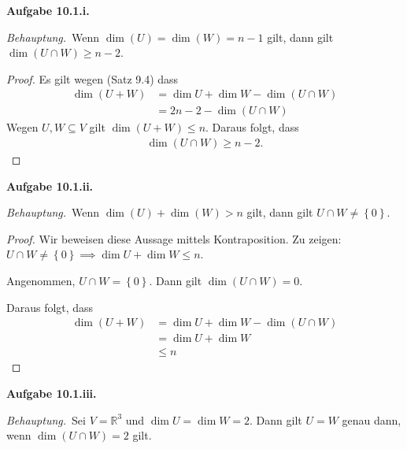 \documentclass[12pt]{extarticle}
\newcommand{\mg}[1]{\mathbb{#1}}
\newcommand{\aufgn}[1]{\textbf{Aufgabe #1.}}
\newcommand{\beh}{\textit{Behauptung.}\ }
\begin{document}
\aufgn{10.1.i}

\beh Wenn \(\dim(U) = \dim(W) = n - 1\) gilt, dann gilt
\(\dim(U \cap W) \ge n - 2\).

\begin{proof}
Es gilt wegen (Satz 9.4) dass
\begin{align*}
  \dim(U + W)
  &= \dim U + \dim W - \dim (U \cap W) \\
  &= 2n - 2 - \dim (U \cap W)
\end{align*}
Wegen \(U, W \subseteq V\) gilt \(\dim(U + W) \le n\).
Daraus folgt, dass
\begin{align*}
\dim(U \cap W) \ge n - 2.
\end{align*}
\end{proof}

\aufgn{10.1.ii}

\beh Wenn \(\dim(U) + \dim(W) > n\) gilt, dann gilt $U
\cap W \ne \left\{ 0 \right\}$.

\begin{proof}
  Wir beweisen diese Aussage mittels Kontraposition.  Zu
  zeigen: $U \cap W \ne \left\{ 0 \right\} \implies \dim
  U + \dim W \le n$.

  Angenommen, \(U \cap W = \left\{ 0 \right\}\).  Dann
  gilt \(\dim(U \cap W) = 0\).

Daraus folgt, dass
\begin{align*}
  \dim(U + W)
  &= \dim U + \dim W - \dim (U \cap W) \\
  &= \dim U + \dim W \\
  &\le n
\end{align*}
\end{proof}

\aufgn{10.1.iii}

\beh Sei \(V = \mg{R}^3\) und \(\dim U = \dim W = 2\).  Dann
gilt \(U = W\) genau dann, wenn \(\dim (U \cap W) = 2\)
gilt.
\end{document}
